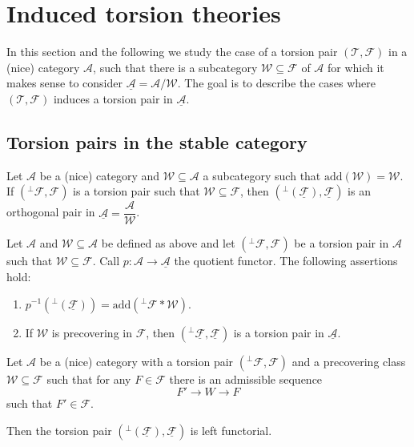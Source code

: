 \clearpage

\section{Induced torsion theories}

In this section and the following we study the case of a torsion pair $(\mathcal{T},\mathcal{F})$
in a (nice) category $\mathcal{A}$, such that there is a subcategory $\mathcal{W}\subseteq\mathcal{F}$
of $\mathcal{A}$ for which it makes sense to consider $\underline{\mathcal{A}}=\mathcal{A}/\mathcal{W}$. The goal is to
describe the cases where $(\mathcal{T},\mathcal{F})$ induces a torsion pair in $\underline{\mathcal{A}}$.

\subsection{Torsion pairs in the stable category}

\begin{lemma}
  Let $\mathcal{A}$ be a (nice) category and $\mathcal{W}\subseteq\mathcal{A}$ a subcategory
  such that $\mathrm{add}(\mathcal{W})=\mathcal{W}$. If $(^\perp\mathcal{F},\mathcal{F})$ is a torsion pair
  such that $\mathcal{W}\subseteq \mathcal{F}$, then $(^\perp(\underline{\mathcal{F}}),\underline{\mathcal{F}})$
  is an orthogonal pair in $\underline{\mathcal{A}}=\dfrac{\mathcal{A}}{\mathcal{W}}$.
\end{lemma}

\begin{lemma}\label{lem:notes:3}
  Let $\mathcal{A}$ and $\mathcal{W}\subseteq\mathcal{A}$ be defined as above and let
  $(^\perp\mathcal{F},\mathcal{F})$ be a torsion pair in $\mathcal{A}$ such that $\mathcal{W}\subseteq\mathcal{F}$.
  Call $p:\mathcal{A}\to \underline{\mathcal{A}}$ the quotient functor.
  The following assertions hold:
  \begin{enumerate}
    \item $p^{-1}(^\perp(\underline{\mathcal{F}}))=\mathrm{add}(^\perp\mathcal{F}\ast\mathcal{W})$.
    \item If $\mathcal{W}$ is precovering in $\mathcal{F}$, then $(^\perp\underline{\mathcal{F}},\underline{\mathcal{F}})$
    is a torsion pair in $\underline{\mathcal{A}}$.
  \end{enumerate}
\end{lemma}

\begin{lemma}
  Let $\mathcal{A}$ be a (nice) category with a torsion pair $(^\perp\mathcal{F}, \mathcal{F})$ and a precovering class
  $\mathcal{W}\subseteq \mathcal{F}$ such that for any $F\in\mathcal{F}$ there is an admissible
  sequence
  \begin{equation*}
    F'\to W\to F
  \end{equation*}
  such that $F'\in\mathcal{F}$.

  Then the torsion pair $(^\perp(\underline{\mathcal{F}}),\underline{\mathcal{F}})$ is left functorial.
\end{lemma}

